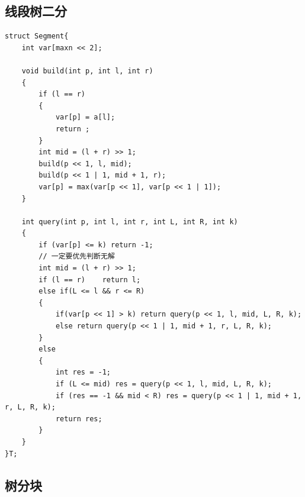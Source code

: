 \documentclass[11pt,a4paper]{ctexart}
\begin{document}
\subsection{线段树二分}

\begin{lstlisting}
struct Segment{
    int var[maxn << 2];

    void build(int p, int l, int r)
    {
        if (l == r)
        {
            var[p] = a[l];
            return ;
        }
        int mid = (l + r) >> 1;
        build(p << 1, l, mid);
        build(p << 1 | 1, mid + 1, r);
        var[p] = max(var[p << 1], var[p << 1 | 1]);
    }

    int query(int p, int l, int r, int L, int R, int k)
    {
        if (var[p] <= k) return -1;
        // 一定要优先判断无解
        int mid = (l + r) >> 1;
        if (l == r)    return l;
        else if(L <= l && r <= R)
        {
            if(var[p << 1] > k) return query(p << 1, l, mid, L, R, k);
            else return query(p << 1 | 1, mid + 1, r, L, R, k);
        }
        else
        {
            int res = -1;
            if (L <= mid) res = query(p << 1, l, mid, L, R, k);
            if (res == -1 && mid < R) res = query(p << 1 | 1, mid + 1, r, L, R, k);
            return res;
        }
    }
}T;
\end{lstlisting}

\subsection{树分块}
\end{document}
